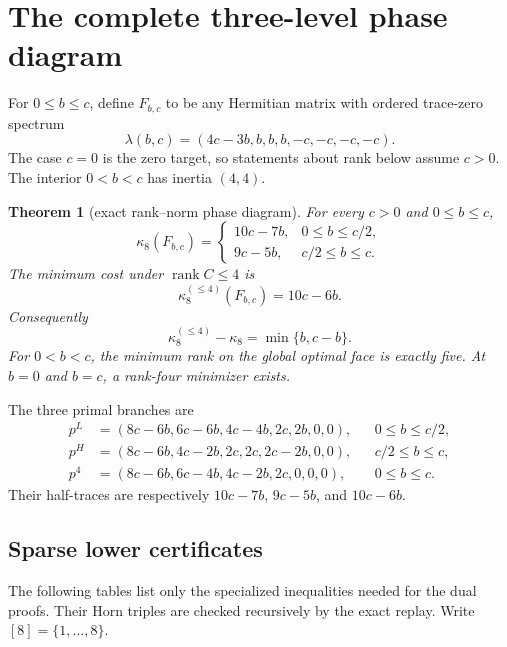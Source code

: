 \documentclass[11pt]{article}
\newtheorem{theorem}{Theorem}[section]
\newcommand{\rank}{\operatorname{rank}}
\begin{document}
\section{The complete three-level phase diagram}

For $0\le b\le c$, define $F_{b,c}$ to be any Hermitian matrix with ordered
trace-zero spectrum
\begin{equation}
 \lambda(b,c)=(4c-3b,b,b,b,-c,-c,-c,-c).
 \label{eq:family}
\end{equation}
The case $c=0$ is the zero target, so statements about rank below assume
$c>0$.  The interior $0<b<c$ has inertia $(4,4)$.

\begin{theorem}[exact rank--norm phase diagram]\label{thm:phase}
For every $c>0$ and $0\le b\le c$,
\begin{equation}
 \kappa_8(F_{b,c})=
 \begin{cases}
  10c-7b,&0\le b\le c/2,\\
  9c-5b,&c/2\le b\le c.
 \end{cases}
 \label{eq:globalvalue}
\end{equation}
The minimum cost under $\rank C\le4$ is
\begin{equation}
 \kappa_8^{(\le4)}(F_{b,c})=10c-6b.
 \label{eq:facevalue}
\end{equation}
Consequently
\begin{equation}
 \kappa_8^{(\le4)}-\kappa_8=\min\{b,c-b\}.
 \label{eq:tent}
\end{equation}
For $0<b<c$, the minimum rank on the global optimal face is exactly five.
At $b=0$ and $b=c$, a rank-four minimizer exists.
\end{theorem}

The three primal branches are
\begin{align}
 p^{L}&=(8c-6b,6c-6b,4c-4b,2c,2b,0,0),
 &&0\le b\le c/2, \label{eq:plow}\\
 p^{H}&=(8c-6b,4c-2b,2c,2c,2c-2b,0,0),
 &&c/2\le b\le c, \label{eq:phigh}\\
 p^{4}&=(8c-6b,6c-4b,4c-2b,2c,0,0,0),
 &&0\le b\le c. \label{eq:pface}
\end{align}
Their half-traces are respectively $10c-7b$, $9c-5b$, and $10c-6b$.

\subsection{Sparse lower certificates}

The following tables list only the specialized inequalities needed for the
dual proofs.  Their Horn triples are checked recursively by the exact replay.
Write $[8]=\{1,\ldots,8\}$.
\end{document}
